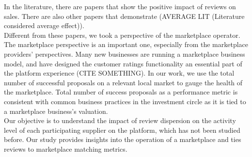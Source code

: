 \documentclass[msom,blindrev]{informs3}
\begin{document}
In the literature, there are papers that show the positive impact of reviews on sales. There are also other papers that demonstrate  (AVERAGE LIT (Literature considered average effect)).\\



Different from these papers, we took a perspective of the marketplace operator. The marketplace perspective is an important one, especially from the marketplace providers' perspectives. Many new businesses are running a marketplace business model, and have designed the customer ratings functionality an essential part of the platform experience (CITE SOMETHING). In our work, we use the total number of successful proposals on a relevant local market to gauge the health of the marketplace. Total number of success proposals as a performance metric is consistent with common business practices in the investment circle \citep{boris_2018,galston_2017} as it is tied to a marketplace business's valuation. \\

Our objective is to understand the impact of review dispersion on the activity level of each participating supplier on the platform, which has not been studied before. Our study provides insights into the operation of a marketplace and ties reviews to marketplace matching metrics.
\end{document}
